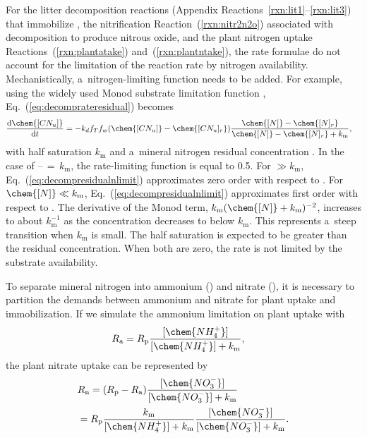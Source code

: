 \documentclass[gmd,noline]{copernicus}
\begin{document}
      For the litter decomposition reactions (Appendix Reactions~\ref{rxn:lit1}--\ref{rxn:lit3}) that immobilize ,
      the nitrification Reaction~(\ref{rxn:nitr2n2o}) associated with
      decomposition to produce nitrous oxide, and the plant nitrogen uptake
      Reactions~(\ref{rxn:plantatake}) and~(\ref{rxn:plantntake}), the rate
      formulae do not account for the limitation of the reaction rate by
      nitrogen availability.  Mechanistically, a~nitrogen-limiting function
      needs to be added. For example, using the widely used Monod substrate
      limitation function \citep{Fennell1998},
      Eq.~(\ref{eq:decomprateresidual}) becomes\hack{\newpage}
\begin{align}
 &
\hack{\hbox\bgroup\fontsize{9.5}{9.5}\selectfont$\displaystyle}\frac{\mathrm{d}
\chem{[CN_u]}}{\mathrm{d} t} = -k_{d} f_{T} f_{w} (\chem{[CN_u]} -
\chem{[CN_u]_r}) \frac{\chem{[N]}-\chem{[N]_r}}{\chem{[N]}-\chem{[N]_r}
+k_\mathrm{m}},\hack{$\egroup} \label{eq:decompresidualnlimit}
\end{align}%
      with half saturation $k_\mathrm{m}$ and a~mineral nitrogen residual
      concentration . In the case of
      \chem{[N]}--\,$=$\,$k_\mathrm{m}$, the rate-limiting function is equal to 0.5. For
      \chem{[N]} $\gg k_\mathrm{m}$, Eq.~(\ref{eq:decompresidualnlimit})
      approximates zero order with respect to \chem{[N]}. For $\chem{[N]}\ll
      k_\mathrm{m}$, Eq.~(\ref{eq:decompresidualnlimit}) approximates first
      order with respect to \chem{[N]}. The derivative of the Monod term,
      ${k_\mathrm{m}}{(\chem{[N]}+k_\mathrm{m})^{-2}}$, increases to about
      $k_\mathrm{m}^{-1}$ as the concentration decreases to below
      $k_\mathrm{m}$. This represents a~steep transition when $k_\mathrm{m}$ is
      small. The half saturation is expected to be greater than the residual
      concentration. When both are zero, the rate is not limited by the
      substrate availability.

      To separate mineral nitrogen into ammonium () and nitrate
      (), it is necessary to partition the demands between
      ammonium and nitrate for plant uptake and immobilization. If we
      simulate the ammonium limitation on plant uptake with
\begin{align}
 &
R_\mathrm{a} = R_\mathrm{p} \frac{[\chem{NH_4^+}]}{[\chem{NH_4^+}]+k_\mathrm{m}},
\label{eq:plantarate}
\end{align}%
      the plant nitrate uptake can be represented by\hack{\newpage}
\begin{align}
 &
R_\mathrm{n} = (R_\mathrm{p} - R_\mathrm{a})
\frac{[\chem{NO_3^-}]}{[\chem{NO_3^-}]+k_\mathrm{m}}\nonumber\\& =
R_\mathrm{p} \frac{k_\mathrm{m}}{[\chem{NH_4^+}]+k_\mathrm{m}}
\frac{[\chem{NO_3^-}]}{[\chem{NO_3^-}]+k_\mathrm{m}}. \label{eq:plantnrate}
\end{align}%
\end{document}
